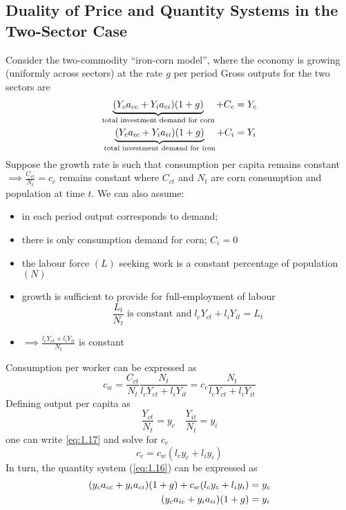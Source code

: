 \documentclass[a4paper,twoside]{article}
\numberwithin{equation}{section}
\numberwithin{figure}{section}
\begin{document}
\subsection{Duality of Price and Quantity Systems in the Two-Sector Case}
	Consider the two-commodity ``iron-corn model'', where the economy is growing (uniformly across sectors) at the rate \( g \) per period
	Gross outputs for the two sectors are
	\begin{align}
		\underbrace{(Y_c a_{cc} + Y_i a_{ci})(1+g)}_{\text{total investment demand for corn}} + C_c &= Y_c \notag\\
		\underbrace{(Y_c a_{ic} + Y_i a_{ii})(1+g)}_{\text{total investment demand for iron}} + C_i &= Y_i \label{eq:1.16}
	\end{align}
	Suppose the growth rate is such that consumption per capita remains constant \( \implies \frac{C_{ct}}{N_t} = c_c \) remains constant where \( C_{ct} \) and \( N_t \) are corn consumption and population at time \( t \). We can also assume:
	\begin{itemize}
		\item in each period output corresponds to demand;
		\item there is only consumption demand for corn; \( C_i = 0 \)
		\item the labour force \( (L) \)  seeking work is a constant percentage of population \( (N) \)
		\item growth is sufficient to provide for full-employment of labour
		\[
			\frac{L_t}{N_t} \;\text{is constant and}\; l_c Y_{ct} + l_i Y_{it} = L_t
		\]
		\item \( \implies \frac{l_c Y_{ct} + l_i Y_{it}}{N_t} \) is constant
	\end{itemize}
	Consumption per worker can be expressed as
	\begin{equation}
		c_w = \frac{C_{ct}}{N_t}\frac{N_t}{l_c Y_{ct} + l_i Y_{it}} = c_c \frac{N_t}{l_c Y_{ct} + l_i Y_{it}} \label{eq:1.17}
	\end{equation}
	Defining output per capita as
	\[
		\frac{Y_{ct}}{N_t} = y_c \quad \frac{Y_{it}}{N_t} = y_i
	\]
	one can write \cref{eq:1.17} and solve for \( c_c \)
	\begin{equation}
		c_c = c_w(l_c y_c + l_i y_i) \label{eq:1.18}
	\end{equation}
	In turn, the quantity system (\ref{eq:1.16}) can be expressed as 
	\begin{align}
		(y_c a_{cc} + y_i a_{ci})(1+g) + c_w (l_c y_c + l_i y_i) &= y_c \notag \\
		(y_c a_{ic} + y_i a_{ii})(1+g) &= y_i \label{eq:1.19}
	\end{align}
\end{document}
